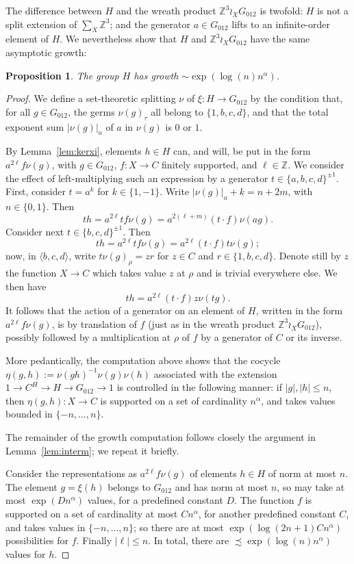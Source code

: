 \documentclass{amsart}
\newcommand\Z{\mathbb{Z}}
\newcommand\Grig{{G_{012}}}
\newtheorem{proposition}[lemma]{Proposition}
\theoremstyle{definition}
\begin{document}
The difference between $H$ and the wreath product $\Z^3\wr_X\Grig$ is
twofold: $H$ is not a split extension of $\sum_X\Z^3$; and the
generator $a\in\Grig$ lifts to an infinite-order element of $H$. We
nevertheless show that $H$ and $\Z^3\wr_X\Grig$ have the same
asymptotic growth:
\begin{proposition}\label{prop:tf}
  The group $H$ has growth $\sim\exp(\log(n)n^\alpha)$.
\end{proposition}
\begin{proof}
  We define a set-theoretic splitting $\nu$ of $\xi:H\to\Grig$ by
  the condition that, for all $g\in\Grig$, the germs $\nu(g)_\tau$
  all belong to $\{1,b,c,d\}$, and that the total exponent sum $|\nu(g)|_a$
  of $a$ in $\nu(g)$ is $0$ or $1$.

  By Lemma~\ref{lem:kerxi}, elements $h\in H$ can, and will, be put in
  the form $a^{2\ell}f\nu(g)$, with $g\in\Grig$, $f:X\to C$ finitely
  supported, and $\ell\in\Z$. We consider the effect of
  left-multiplying such an expression by a generator
  $t\in\{a,b,c,d\}^{\pm1}$. First, consider $t=a^k$ for
  $k\in\{1,-1\}$. Write $|\nu(g)|_a+k=n+2m$, with
  $n\in\{0,1\}$. Then
  \[th = a^{2\ell}tf\nu(g)=a^{2(\ell+m)}(t\cdot f)\nu(ag).
  \]
  Consider next $t\in\{b,c,d\}^{\pm1}$. Then
  \[th = a^{2\ell}tf\nu(g)=a^{2\ell}(t\cdot f)t\nu(g);
  \]
  now, in $\langle b,c,d\rangle$, write $t\nu(g)_\rho=zr$ for $z\in
  C$ and $r\in\{1,b,c,d\}$. Denote still by $z$ the function $X\to C$
  which takes value $z$ at $\rho$ and is trivial everywhere else. We
  then have
  \[th = a^{2\ell}(t\cdot f)z\nu(tg).
  \]
  It follows that the action of a generator on an element of $H$,
  written in the form $a^{2\ell}f\nu(g)$, is by translation of $f$
  (just as in the wreath product $\Z^3\wr_X\Grig$), possibly followed
  by a multiplication at $\rho$ of $f$ by a generator of $C$ or its
  inverse.

  More pedantically, the computation above shows that the cocycle
  $\eta(g,h):=\nu(gh)^{-1}\nu(g)\nu(h)$ associated with the
  extension $1\to C^H\to H\to\Grig\to 1$ is controlled in the
  following manner: if $|g|,|h|\le n$, then $\eta(g,h):X\to C$ is
  supported on a set of cardinality $n^\alpha$, and takes values
  bounded in $\{-n,\dots,n\}$.

  The remainder of the growth computation follows closely the argument
  in Lemma~\ref{lem:interm}; we repeat it briefly.

  Consider the representations as $a^{2\ell}f\nu(g)$ of elements $h\in
  H$ of norm at most $n$. The element $g=\xi(h)$ belongs to $\Grig$
  and has norm at most $n$, so may take at most $\exp(Dn^\alpha)$
  values, for a predefined constant $D$. The function $f$ is supported
  on a set of cardinality at most $Cn^\alpha$, for another predefined
  constant $C$, and takes values in $\{-n,\dots,n\}$; so there are at
  most $\exp(\log(2n+1)Cn^\alpha)$ possibilities for $f$. Finally
  $|\ell|\le n$. In total, there are $\precsim\exp(\log(n)n^\alpha)$
  values for $h$.


\end{proof}
\end{document}
